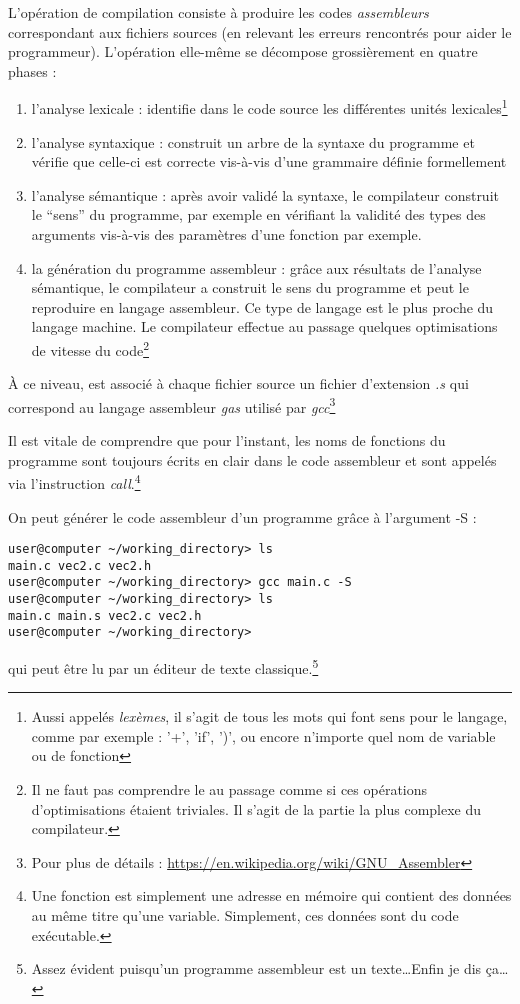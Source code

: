 \documentclass[../../../main.tex]{subfiles}
\begin{document}
L'opération de compilation consiste à produire les codes \textit{assembleurs} correspondant aux fichiers sources (en relevant les erreurs rencontrés pour aider le programmeur). L'opération elle-même se décompose grossièrement en quatre phases :
\begin{enumerate}
	\item l'analyse lexicale : identifie dans le code source les différentes unités lexicales\footnote{Aussi appelés \textit{lexèmes}, il s'agit de tous les mots qui font sens pour le langage, comme par exemple : '+', 'if', ')', ou encore n'importe quel nom de variable ou de fonction}
	\item l'analyse syntaxique : construit un arbre de la syntaxe du programme et vérifie que celle-ci est correcte vis-à-vis d'une grammaire définie formellement
	\item l'analyse sémantique : après avoir validé la syntaxe, le compilateur construit le ``sens'' du programme, par exemple en vérifiant la validité des types des arguments vis-à-vis des paramètres d'une fonction par exemple.
	\item la génération du programme assembleur : grâce aux résultats de l'analyse sémantique, le compilateur a construit le sens du programme et peut le reproduire en langage assembleur. Ce type de langage est le plus proche du langage machine. Le compilateur effectue au passage quelques optimisations de vitesse du code\footnote{Il ne faut pas comprendre le \og au passage \fg comme si ces opérations d'optimisations étaient triviales. Il s'agit de la partie la plus complexe du compilateur.}
\end{enumerate}
À ce niveau, est associé à chaque fichier source un fichier d'extension \textit{.s} qui correspond au langage assembleur \textit{gas} utilisé par \textit{gcc}\footnote{Pour plus de détails : \url{https://en.wikipedia.org/wiki/GNU_Assembler}}

Il est vitale de comprendre que pour l'instant, les noms de fonctions du programme sont toujours écrits en clair dans le code assembleur et sont appelés via l'instruction \textit{call}.\footnote{Une fonction est simplement une adresse en mémoire qui contient des données au même titre qu'une variable. Simplement, ces données sont du code exécutable.}

On peut générer le code assembleur d'un programme grâce à l'argument \textsf{-S} :
\begin{verbatim}
user@computer ~/working_directory> ls
main.c vec2.c vec2.h
user@computer ~/working_directory> gcc main.c -S
user@computer ~/working_directory> ls
main.c main.s vec2.c vec2.h
user@computer ~/working_directory>
\end{verbatim}
qui peut être lu par un éditeur de texte classique.\footnote{Assez évident puisqu'un programme assembleur est un texte\dots Enfin je dis ça\dots}
\end{document}
